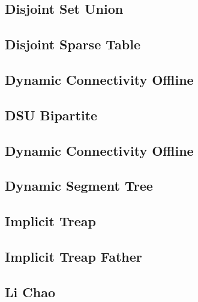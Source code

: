 \subsection{Disjoint Set Union}
\raggedbottom
\hrulefill
\subsection{Disjoint Sparse Table}
\raggedbottom
\hrulefill
\subsection{Dynamic Connectivity Offline}
\raggedbottom
\hrulefill
\subsection{DSU Bipartite}
\raggedbottom
\hrulefill
\subsection{Dynamic Connectivity Offline}
\raggedbottom
\hrulefill
\subsection{Dynamic Segment Tree}
\raggedbottom
\hrulefill
\subsection{Implicit Treap}
\raggedbottom
\hrulefill
\subsection{Implicit Treap Father}
\raggedbottom
\hrulefill
\subsection{Li Chao}
\raggedbottom
\hrulefill
